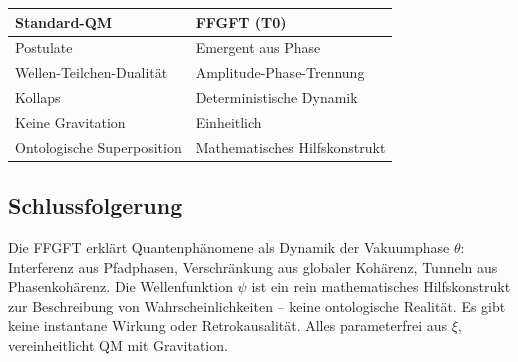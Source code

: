 	\begin{center}
		\begin{tabular}{p{}p{}}
			\textbf{Standard-QM} & \textbf{FFGFT (T0)} \\
			\hline
			Postulate & Emergent aus Phase \\
			Wellen-Teilchen-Dualität & Amplitude-Phase-Trennung \\
			Kollaps & Deterministische Dynamik \\
			Keine Gravitation & Einheitlich \\
			Ontologische Superposition & Mathematisches Hilfskonstrukt \\
		\end{tabular}
	\end{center}
	
	\subsection*{Schlussfolgerung}
	
	Die FFGFT erklärt Quantenphänomene als Dynamik der Vakuumphase \(\theta\): Interferenz aus Pfadphasen, Verschränkung aus globaler Kohärenz, Tunneln aus Phasenkohärenz. Die Wellenfunktion \(\psi\) ist ein rein mathematisches Hilfskonstrukt zur Beschreibung von Wahrscheinlichkeiten – keine ontologische Realität. Es gibt keine instantane Wirkung oder Retrokausalität. Alles parameterfrei aus \(\xi\), vereinheitlicht QM mit Gravitation.




